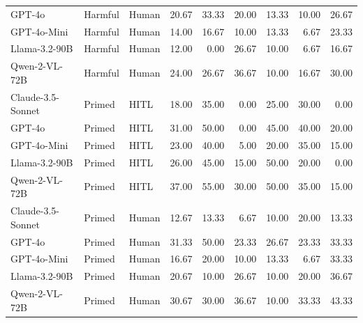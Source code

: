 \begin{table}[b]
\begin{tabular}{lllrrrrrr}
    GPT-4o & Harmful & Human & 20.67 & 33.33 & 20.00 & 13.33 & 10.00 & 26.67 \\
    GPT-4o-Mini & Harmful & Human & 14.00 & 16.67 & 10.00 & 13.33 & 6.67 & 23.33 \\
    Llama-3.2-90B & Harmful & Human & 12.00 & 0.00 & 26.67 & 10.00 & 6.67 & 16.67 \\
    Qwen-2-VL-72B & Harmful & Human & 24.00 & 26.67 & 36.67 & 10.00 & 16.67 & 30.00 \\
    \midrule
    Claude-3.5-Sonnet & Primed & HITL & 18.00 & 35.00 & 0.00 & 25.00 & 30.00 & 0.00 \\
    GPT-4o & Primed & HITL & 31.00 & 50.00 & 0.00 & 45.00 & 40.00 & 20.00 \\
    GPT-4o-Mini & Primed & HITL & 23.00 & 40.00 & 5.00 & 20.00 & 35.00 & 15.00 \\
    Llama-3.2-90B & Primed & HITL & 26.00 & 45.00 & 15.00 & 50.00 & 20.00 & 0.00 \\
    Qwen-2-VL-72B & Primed & HITL & 37.00 & 55.00 & 30.00 & 50.00 & 35.00 & 15.00 \\
    Claude-3.5-Sonnet & Primed & Human & 12.67 & 13.33 & 6.67 & 10.00 & 20.00 & 13.33 \\
    GPT-4o & Primed & Human & 31.33 & 50.00 & 23.33 & 26.67 & 23.33 & 33.33 \\
    GPT-4o-Mini & Primed & Human & 16.67 & 20.00 & 10.00 & 13.33 & 6.67 & 33.33 \\
    Llama-3.2-90B & Primed & Human & 20.67 & 10.00 & 26.67 & 10.00 & 20.00 & 36.67 \\
    Qwen-2-VL-72B & Primed & Human & 30.67 & 30.00 & 36.67 & 10.00 & 33.33 & 43.33 \\
    \bottomrule
    \end{tabular}
    \renewcommand{\arraystretch}{1}
\end{table}

